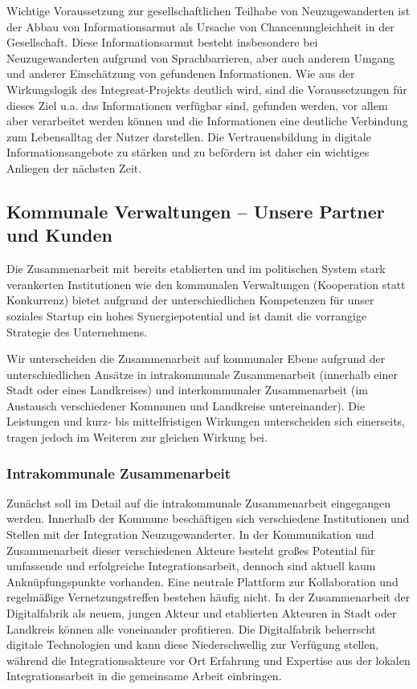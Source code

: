 \documentclass[12pt, a4paper]{article} %
\begin{document}
Wichtige Voraussetzung zur gesellschaftlichen Teilhabe von
Neuzugewanderten ist der Abbau von Informationsarmut als Ursache von
Chancenungleichheit in der Gesellschaft. Diese Informationsarmut besteht
insbesondere bei Neuzugewanderten aufgrund von Sprachbarrieren, aber
auch anderem Umgang und anderer Einschätzung von gefundenen
Informationen. Wie aus der Wirkungslogik des Integreat-Projekts deutlich
wird, sind die Voraussetzungen für dieses Ziel u.a. das Informationen
verfügbar sind, gefunden werden, vor allem aber verarbeitet werden
können und die Informationen eine deutliche Verbindung zum Lebensalltag
der Nutzer darstellen. Die Vertrauensbildung in digitale
Informationsangebote zu stärken und zu befördern ist daher ein wichtiges
Anliegen der nächsten Zeit.

\hypertarget{kommunale-verwaltungen-unsere-partner-und-kunden}{%
\subsection{Kommunale Verwaltungen – Unsere Partner und
Kunden}\label{kommunale-verwaltungen-unsere-partner-und-kunden}}

Die Zusammenarbeit mit bereits etablierten und im politischen System
stark verankerten Institutionen wie den kommunalen Verwaltungen
(Kooperation statt Konkurrenz) bietet aufgrund der unterschiedlichen
Kompetenzen für unser soziales Startup ein hohes Synergiepotential und
ist damit die vorrangige Strategie des Unternehmens.

Wir unterscheiden die Zusammenarbeit auf kommunaler Ebene aufgrund der
unterschiedlichen Ansätze in intrakommunale Zusammenarbeit (innerhalb
einer Stadt oder eines Landkreises) und interkommunaler Zusammenarbeit
(im Austausch verschiedener Kommunen und Landkreise untereinander). Die
Leistungen und kurz- bis mittelfristigen Wirkungen unterscheiden sich
einerseits, tragen jedoch im Weiteren zur gleichen Wirkung bei.

\hypertarget{intrakommunale-zusammenarbeit}{%
\subsubsection{Intrakommunale Zusammenarbeit}\label{intrakommunale-zusammenarbeit}}

Zunächst soll im Detail auf die intrakommunale Zusammenarbeit
eingegangen werden. Innerhalb der Kommune beschäftigen sich verschiedene
Institutionen und Stellen mit der Integration Neuzugewanderter. In der
Kommunikation und Zusammenarbeit dieser verschiedenen Akteure besteht
großes Potential für umfassende und erfolgreiche Integrationsarbeit,
dennoch sind aktuell kaum Anknüpfungspunkte vorhanden. Eine neutrale
Plattform zur Kollaboration und regelmäßige Vernetzungstreffen bestehen
häufig nicht. In der Zusammenarbeit der Digitalfabrik als neuem, jungen
Akteur und etablierten Akteuren in Stadt oder Landkreis können alle
voneinander profitieren. Die Digitalfabrik beherrscht digitale
Technologien und kann diese Niederschwellig zur Verfügung stellen,
während die Integrationsakteure vor Ort Erfahrung und Expertise aus der
lokalen Integrationsarbeit in die gemeinsame Arbeit einbringen.
\end{document}
